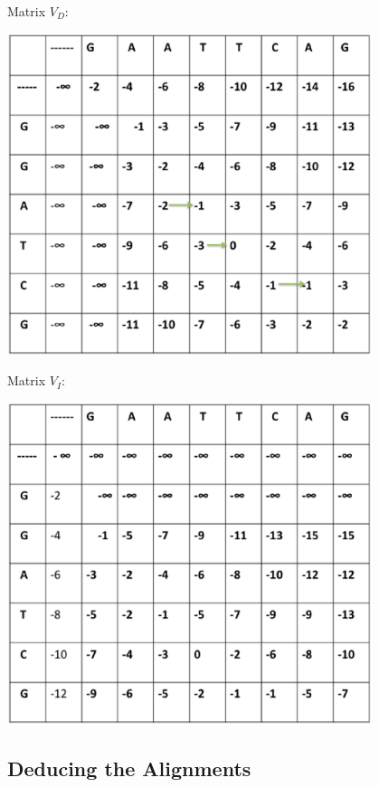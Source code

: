 \documentclass[english, a4paper,11pt]{article}
\begin{document}
\newpage
Matrix $V_D$:
\begin{center}
\includegraphics[width=0.8\textwidth]{Slide2.eps}
\end{center}

Matrix $V_I$:
\begin{center}

\includegraphics[width=0.8\textwidth]{Slide3.eps}
\end{center}
 \newpage
\subsection{Deducing the Alignments}
\end{document}
